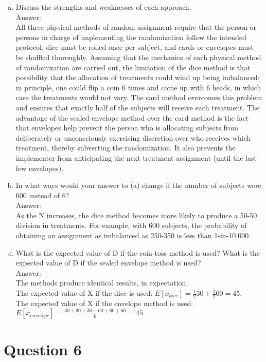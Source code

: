 \documentclass[11pt,notitlepage]{article}\usepackage[]{graphicx}\usepackage[]{color}
\makeatletter
\newenvironment{kframe}{%
 \def\at@end@of@kframe{}%
 \ifinner\ifhmode%
  \def\at@end@of@kframe{\end{minipage}}%
  \begin{minipage}{\columnwidth}%
 \fi\fi%
 \def\FrameCommand##1{\hskip\@totalleftmargin \hskip-\fboxsep
 \colorbox{shadecolor}{##1}\hskip-\fboxsep
     \hskip-\linewidth \hskip-\@totalleftmargin \hskip\columnwidth}%
 \MakeFramed {\advance\hsize-\width
   \@totalleftmargin\z@ \linewidth\hsize
   \@setminipage}}%
 {\par\unskip\endMakeFramed%
 \at@end@of@kframe}
\newenvironment{knitrout}{}{} %
\makeatother
\begin{document}
\begin{enumerate}[a)]
\item Discuss the strengths and weaknesses of each approach.\\
Answer:\\
All three physical methods of random assignment require that the person or persons in charge of implementing the randomization follow the intended protocol: dice must be rolled once per subject, and cards or envelopes must be shuffled thoroughly. Assuming that the mechanics of each physical method of randomization are carried out, the limitation of the dice method is that possibility that the allocation of treatments could wind up being imbalanced; in principle, one could flip a coin 6 times and come up with 6 heads, in which case the treatments would not vary. The card method overcomes this problem and ensures that exactly half of the subjects will receive each treatment. The advantage of the sealed envelope method over the card method is the fact that envelopes help prevent the person who is allocating subjects from deliberately or unconsciously exercising discretion over who receives which treatment, thereby subverting the randomization.  It also prevents the implementer from anticipating the next treatment assignment (until the last few envelopes).
\item In what ways would your answer to (a) change if the number of subjects were 600 instead of 6?  \\
Answer:\\
As the N increases, the dice method becomes more likely to produce a 50-50 division in treatments. For example, with 600 subjects, the probability of obtaining an assignment as imbalanced as 250-350 is less than 1-in-10,000. 
\item What is the expected value of D if the coin toss method is used?  What is the expected value of D if the sealed envelope method is used? \\
Answer:\\
The methods produce identical results, in expectation. \\
The expected value of X if the dice is used: $E[x_{dice}]=\frac{1}{2} 30+ \frac{1}{2} 60=45$.  \\
The expected value of X if the envelope method is used: $E[x_{envelope}]=\frac{30+30+30+60+60+60}{6}=45$\\
\end{enumerate}

\section*{Question 6}
\begin{knitrout}
\color{fgcolor}\begin{kframe}
\begin{verbatim}





\end{verbatim}
\end{kframe}
\end{knitrout}
\end{document}
